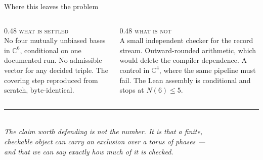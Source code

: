 \documentclass[aspectratio=169,11pt]{beamer}
\newcommand{\C}{\mathbb{C}}
\begin{document}
\begin{frame}{Where this leaves the problem}
  \vspace{2mm}
  \begin{columns}[T]
  \begin{column}{0.48\textwidth}
    {\color{ox}\scshape what is settled}\\[1.5mm]
    No four mutually unbiased bases in $\C^6$, conditional on one documented run. No admissible
    vector for any decided triple. The covering step reproduced from scratch, byte-identical.
  \end{column}
  \begin{column}{0.48\textwidth}
    {\color{ox}\scshape what is not}\\[1.5mm]
    A small independent checker for the record stream. Outward-rounded arithmetic, which would
    delete the compiler dependence. A control in $\C^4$, where the same pipeline must fail. The
    Lean assembly is conditional and stops at $N(6)\le5$.
  \end{column}
  \end{columns}

  \vspace{6mm}
  \begin{center}
    {\color{ox}\rule{22mm}{1.2pt}}\\[3mm]
    {\normalsize\itshape The claim worth defending is not the number. It is that a finite,\\
    checkable object can carry an exclusion over a torus of phases ---\\
    and that we can say exactly how much of it is checked.}
  \end{center}
\end{frame}
\end{document}
